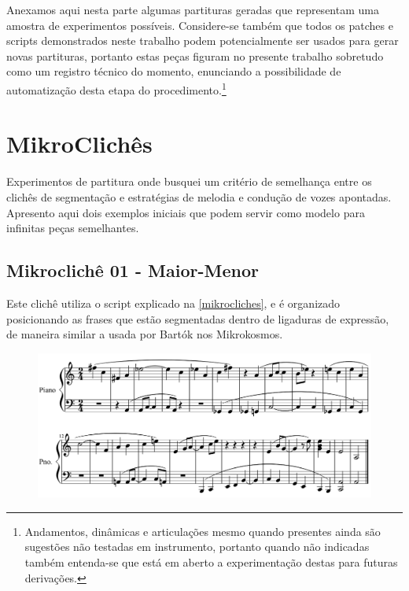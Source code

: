 \documentclass[
	12pt,				%
	openright,			%
	twoside,			%
	a4paper,			%
	english,			%
	french,				%
	spanish,			%
	brazil				%
	]{abntex2}
\begin{document}
Anexamos aqui nesta parte algumas partituras geradas que representam uma amostra de experimentos possíveis. Considere-se também que todos os patches e scripts demonstrados neste trabalho podem potencialmente ser usados para gerar novas partituras, portanto estas peças figuram no presente trabalho sobretudo como um registro técnico do momento, enunciando a possibilidade de automatização desta etapa do procedimento.\footnote{Andamentos, dinâmicas e articulações mesmo quando presentes ainda são sugestões não testadas em instrumento, portanto quando não indicadas também entenda-se que está em aberto a experimentação destas para futuras derivações.}

\section{MikroClichês}

Experimentos de partitura onde busquei um critério de semelhança entre os clichês de segmentação e estratégias de melodia e condução de vozes apontadas. Apresento aqui dois exemplos iniciais que podem servir como modelo para infinitas peças semelhantes.


\subsection{Mikroclichê 01 - Maior-Menor}

Este clichê utiliza o script explicado na \autoref{mikrocliches}, e é organizado posicionando as frases que estão segmentadas dentro de ligaduras de expressão, de maneira similar a usada por Bartók nos Mikrokosmos. 


\begin{figure}[!h]
	\begin{center}
	    \includegraphics*[scale=0.4]{score/MikroCliche01.png}
	\end{center}
\end{figure}
\end{document}

